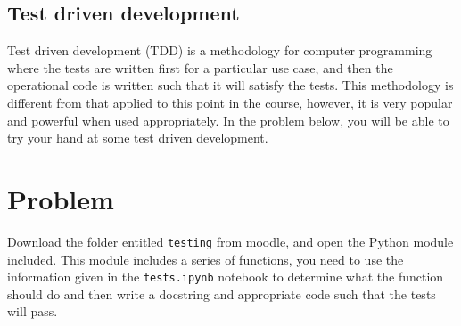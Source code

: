 \documentclass[a4paper]{article}
\begin{document}
\vspace{\baselineskip}
\begin{center}
	\noindent{}
\end{center}

\subsection{Test driven development}
Test driven development (TDD) is a methodology for computer programming where the tests are written first for a particular use case, and then the operational code is written such that it will satisfy the tests.
This methodology is different from that applied to this point in the course, however, it is very popular and powerful when used appropriately.
In the problem below, you will be able to try your hand at some test driven development.

\section{Problem}
Download the folder entitled \texttt{testing} from moodle, and open the Python module included.
This module includes a series of functions, you need to use the information given in the \texttt{tests.ipynb} notebook to determine what the function should do and then write a docstring and appropriate code such that the tests will pass. 

%
%
\end{document}
